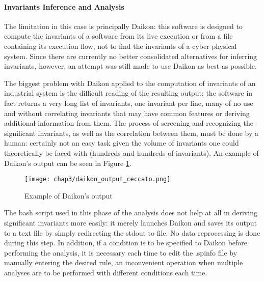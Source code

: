 \paragraph{Invariants Inference and Analysis}
The limitation in this case is principally Daikon: this software is designed to compute the invariants of a software from its live execution or from a file containing its execution flow, not to find the invariants of a cyber physical system. Since there are currently no better consolidated alternatives for inferring invariants, however, an attempt was still made to use Daikon as best as possible.

\bigskip
The biggest problem with Daikon applied to the computation of invariants of an industrial system is the difficult reading of the resulting output: the software in fact returns a very long list of invariants, one invariant per line, many of no use and without correlating invariants that may have common features or deriving additional information from them. The process of screening and recognizing the significant invariants, as well as the correlation between them, must be done by a human: certainly not an easy task given the volume of invariants one could theoretically be faced with (hundreds and hundreds of invariants). An example of Daikon's output can be seen in Figure \ref{fig:daikon_output_ceccato}.

\begin{figure}[ht]
	\centering
	\texttt{[image: chap3/daikon\_output\_ceccato.png]}
	\caption{Example of Daikon's output}
	\label{fig:daikon_output_ceccato}
\end{figure}

\bigskip
The bash script used in this phase of the analysis does not help at all in deriving significant invariants more easily: it merely launches Daikon and saves its output to a text file by simply redirecting the stdout to file. No data reprocessing is done during this step. In addition, if a condition is to be specified to Daikon before performing the analysis, it is necessary each time to edit the .spinfo file by manually entering the desired rule, an inconvenient operation when multiple analyses are to be performed with different conditions each time. 

\vfill
\nolinenumbers
